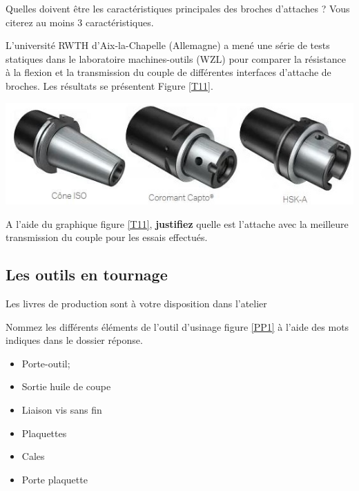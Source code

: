 \documentclass[12pt]{article}
\newcounter{exo}
\newenvironment{exo}{\stepcounter{exo}\vspace{0.5cm}{\bfseries Question \theexo\ :}}{\par\vspace{0.5cm}}
\begin{document}
\begin{exo} Quelles doivent être les caractéristiques principales des broches d'attaches ? Vous citerez au moins 3 caractéristiques.\end{exo}



L'université RWTH d'Aix-la-Chapelle (Allemagne) a mené une série de tests statiques dans le laboratoire machines-outils (WZL) pour comparer la résistance à la flexion et la transmission du couple de différentes interfaces d'attache de broches. Les résultats se présentent Figure \ref{T11}.

\includegraphics[width=0.9\linewidth]{Images/cone1.JPG}


\begin{exo} A l’aide du graphique figure \ref{T11}, \textbf{justifiez} quelle est l’attache avec la meilleure transmission du couple pour les essais effectués. \end{exo}

\subsection{Les outils en tournage}


\begin{tcolorbox}[colback=blue!5!white,colframe=red!75!black]
  \bcinfo Les livres de production sont à votre disposition dans l'atelier
\end{tcolorbox}

\begin{exo} Nommez les différents éléments de l’outil d’usinage figure \ref{PP1} à l'aide des mots
indiques dans le dossier réponse. \end{exo}

\begin{minipage}{.55\linewidth}
\begin{itemize}
    \item Porte-outil;
    \item Sortie huile de coupe
    \item Liaison vis sans fin
\end{itemize} 
\end{minipage}
\begin{minipage}{.44\linewidth}
\begin{itemize}
    \item Plaquettes
    \item Cales
    \item Porte plaquette
\end{itemize} 
\end{minipage}
\end{document}
